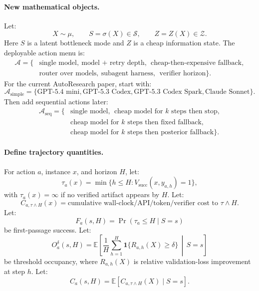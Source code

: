 \documentclass{article}
\begin{document}
\paragraph{New mathematical objects.}
Let:
\[
    X\sim\mu,\qquad
    S=\sigma(X)\in\mathcal S,\qquad
    Z=Z(X)\in\mathcal Z.
\]
Here \(S\) is a latent bottleneck mode and \(Z\) is a cheap information state.
The deployable action menu is:
\[
\begin{aligned}
    \mathcal A=\{&\text{single model},\ \text{model + retry depth},\
    \ \text{cheap-then-expensive fallback},\\
    &\text{router over models},\ \text{subagent harness},\
    \ \text{verifier horizon}\}.
\end{aligned}
\]
For the current AutoResearch paper, start with:
\[
    \mathcal A_{\mathrm{simple}}
    =
    \{
    \text{GPT-5.4 mini},
    \text{GPT-5.3 Codex},
    \text{GPT-5.3 Codex Spark},
    \text{Claude Sonnet}
    \}.
\]
Then add sequential actions later:
\[
\begin{aligned}
    \mathcal A_{\mathrm{seq}}=\{&\text{single model},\
    \ \text{cheap model for \(k\) steps then stop},\\
    &\text{cheap model for \(k\) steps then fixed fallback},\\
    &\text{cheap model for \(k\) steps then posterior fallback}\}.
\end{aligned}
\]

\paragraph{Define trajectory quantities.}
For action \(a\), instance \(x\), and horizon \(H\), let:
\[
    \tau_a(x)
    =
    \min\{h\le H:V_{\mathrm{succ}}(x,y_{a,h})=1\},
\]
with \(\tau_a(x)=\infty\) if no verified artifact appears by \(H\).
Let:
\[
    C_{a,\tau\wedge H}(x)
    =
    \text{cumulative wall-clock/API/token/verifier cost to \(\tau\wedge H\)}.
\]
Let:
\[
    F_a(s,H)
    =
    \Pr(\tau_a\le H\mid S=s)
\]
be first-passage success.
Let:
\[
    O_a^\delta(s,H)
    =
    \mathbb E\left[
        \frac{1}{H}\sum_{h=1}^H
        \mathbf 1\{R_{a,h}(X)\ge \delta\}
        \,\middle|\,
        S=s
    \right]
\]
be threshold occupancy, where \(R_{a,h}(X)\) is relative validation-loss improvement at step \(h\).
Let:
\[
    C_a(s,H)
    =
    \mathbb E[C_{a,\tau\wedge H}(X)\mid S=s].
\]
\end{document}
